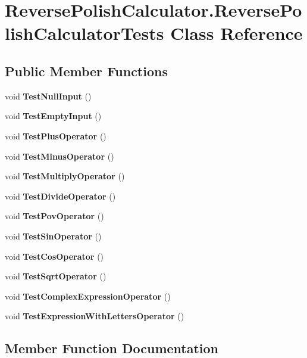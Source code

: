 \section{Reverse\+Polish\+Calculator.\+Reverse\+Polish\+Calculator\+Tests Class Reference}
\label{class_reverse_polish_calculator_1_1_reverse_polish_calculator_tests}
\subsection*{Public Member Functions}
\begin{DoxyCompactItemize}
\item 
void {\bf Test\+Null\+Input} ()
\item 
void {\bf Test\+Empty\+Input} ()
\item 
void {\bf Test\+Plus\+Operator} ()
\item 
void {\bf Test\+Minus\+Operator} ()
\item 
void {\bf Test\+Multiply\+Operator} ()
\item 
void {\bf Test\+Divide\+Operator} ()
\item 
void {\bf Test\+Pov\+Operator} ()
\item 
void {\bf Test\+Sin\+Operator} ()
\item 
void {\bf Test\+Cos\+Operator} ()
\item 
void {\bf Test\+Sqrt\+Operator} ()
\item 
void {\bf Test\+Complex\+Expression\+Operator} ()
\item 
void {\bf Test\+Expression\+With\+Letters\+Operator} ()
\end{DoxyCompactItemize}


\subsection{Member Function Documentation}
